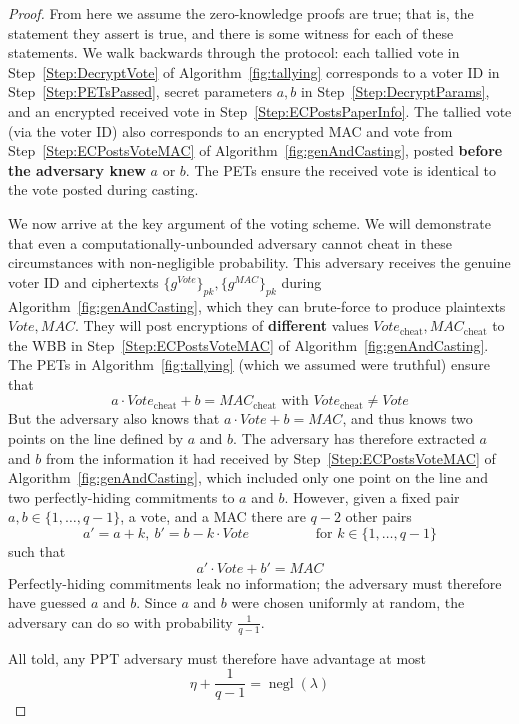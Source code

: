 \documentclass[12pt,a4paper]{article}
\DeclareMathOperator{\negl}{\text{negl}}
\theoremstyle{definition}
\newcommand{\Vote}{\mathit{Vote}}
\newcommand{\Mac}{\mathit{MAC}}
\begin{document}
\begin{proof}
    From here we assume the zero-knowledge proofs are true; that is, the statement they assert is true, and there is some witness for each of these statements. We walk backwards through the protocol: each tallied vote in Step~\ref{Step:DecryptVote} of Algorithm~\ref{fig:tallying} corresponds to a voter ID in Step~\ref{Step:PETsPassed}, secret parameters $a, b$ in Step~\ref{Step:DecryptParams}, and an encrypted received vote in Step~\ref{Step:ECPostsPaperInfo}. The tallied vote (via the voter ID) also corresponds to an encrypted MAC and vote from Step~\ref{Step:ECPostsVoteMAC} of Algorithm~\ref{fig:genAndCasting}, posted \textbf{before the adversary knew} $a$ or $b$. The PETs ensure the received vote is identical to the vote posted during casting.

    We now arrive at the key argument of the voting scheme. We will demonstrate that even a computationally-unbounded adversary cannot cheat in these circumstances with non-negligible probability. This adversary receives the genuine voter ID and ciphertexts $\{g^\Vote\}_{pk}, \{g^\Mac\}_{pk}$ during Algorithm~\ref{fig:genAndCasting}, which they can brute-force to produce plaintexts $\Vote, \Mac$. They will post encryptions of \textbf{different} values $\Vote_\text{cheat}, \Mac_\text{cheat}$ to the WBB in Step~\ref{Step:ECPostsVoteMAC} of Algorithm~\ref{fig:genAndCasting}. The PETs in Algorithm~\ref{fig:tallying} (which we assumed were truthful) ensure that
    $$a\cdot\Vote_\text{cheat}+b=\Mac_\text{cheat}\text{ with }\Vote_\text{cheat}\neq\Vote$$
    But the adversary also knows that $a\cdot\Vote+b=\Mac$, and thus knows two points on the line defined by $a$ and $b$. The adversary has therefore extracted $a$ and $b$ from the information it had received by Step~\ref{Step:ECPostsVoteMAC} of Algorithm~\ref{fig:genAndCasting}, which included only one point on the line and two perfectly-hiding commitments to $a$ and $b$. However, given a fixed pair $a,b\in\{1,\ldots,q-1\}$, a vote, and a MAC there are $q-2$ other pairs
    $$a'=a+k,\ b'=b-k\cdot Vote \hspace{2cm} \text{for }k\in\{1,\ldots,q-1\}$$
    such that
    $$a'\cdot\Vote+b'=\Mac$$
    Perfectly-hiding commitments leak no information; the adversary must therefore have guessed $a$ and $b$. Since $a$ and $b$ were chosen uniformly at random, the adversary can do so with probability $\frac{1}{q-1}$.

    All told, any PPT adversary must therefore have advantage at most
    $$\eta+\frac{1}{q-1}=\negl(\lambda)$$
\end{proof}
\end{document}
